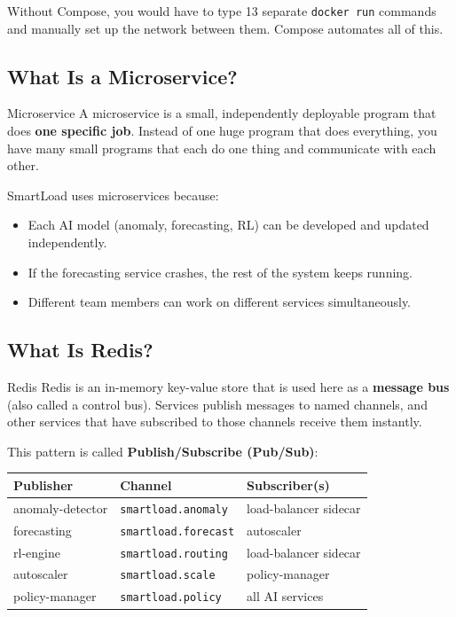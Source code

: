 \documentclass[12pt, a4paper]{article}
\begin{document}
Without Compose, you would have to type 13 separate \texttt{docker run} commands
and manually set up the network between them. Compose automates all of this.

\subsection{What Is a Microservice?}

\begin{definitionbox}{Microservice}
A microservice is a small, independently deployable program that does
\textbf{one specific job}. Instead of one huge program that does everything,
you have many small programs that each do one thing and communicate with each
other.
\end{definitionbox}

SmartLoad uses microservices because:
\begin{itemize}
  \item Each AI model (anomaly, forecasting, RL) can be developed and updated
        independently.
  \item If the forecasting service crashes, the rest of the system keeps running.
  \item Different team members can work on different services simultaneously.
\end{itemize}

\subsection{What Is Redis?}

\begin{definitionbox}{Redis}
Redis is an in-memory key-value store that is used here as a
\textbf{message bus} (also called a control bus). Services publish messages to
named channels, and other services that have subscribed to those channels
receive them instantly.
\end{definitionbox}

This pattern is called \textbf{Publish/Subscribe (Pub/Sub)}:

\begin{center}
\begin{tabular}{lll}
  \toprule
  \textbf{Publisher} & \textbf{Channel} & \textbf{Subscriber(s)} \\
  \midrule
  anomaly-detector & \texttt{smartload.anomaly}   & load-balancer sidecar \\
  forecasting      & \texttt{smartload.forecast}  & autoscaler \\
  rl-engine        & \texttt{smartload.routing}   & load-balancer sidecar \\
  autoscaler       & \texttt{smartload.scale}     & policy-manager \\
  policy-manager   & \texttt{smartload.policy}    & all AI services \\
  \bottomrule
\end{tabular}
\end{center}
\end{document}
